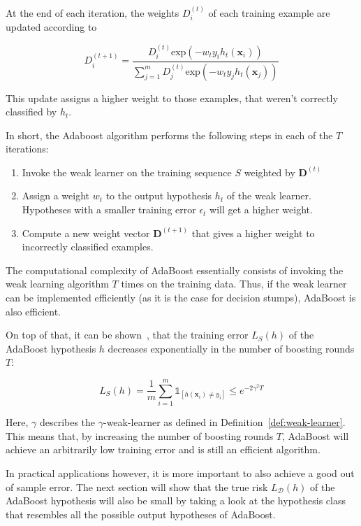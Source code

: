 At the end of each iteration, the weights $D_i^{(t)}$ of each training example are updated according to
\begin{linenomath*}
    $$
    D_i^{(t+1)} = \frac{D_i^{(t)} \text{exp} \left( -w_t y_i h_t(\mathbf{x}_i) \right)}{
        \sum_{j=1}^m D_j^{(t)} \text{exp} \left( -w_t y_j h_t(\mathbf{x}_j) \right) }
    $$
\end{linenomath*}
This update assigns a higher weight to those examples, that weren't correctly classified by $h_t$.

In short, the Adaboost algorithm performs the following steps in each of the $T$ iterations:
\begin{enumerate}
    \item Invoke the weak learner on the training sequence $S$ weighted by $\mathbf{D}^{(t)}$
    \item Assign a weight $w_t$ to the output hypothesis $h_t$ of the weak learner. Hypotheses with a smaller
        training error $\epsilon_t$ will get a higher weight.
    \item Compute a new weight vector $\mathbf{D}^{(t+1)}$ that gives a higher weight to incorrectly classified
        examples.
\end{enumerate}

The computational complexity of AdaBoost essentially consists of invoking the weak learning algorithm $T$ times on
the training data. Thus, if the weak learner can be implemented efficiently (as it is the case for decision stumps),
AdaBoost is also efficient.

On top of that, it can be shown~\cite{SSBD14}, 
that the training error $L_S(h)$ of the AdaBoost hypothesis $h$ decreases exponentially
in the number of boosting rounds $T$:
\begin{linenomath*}
    $$
    L_S(h) = \frac{1}{m} \sum_{i=1}^m \mathds{1}_{\left[ h(\mathbf{x}_i) \neq y_i \right]} \leq e^{-2 \gamma^2 T}
    $$
\end{linenomath*}
Here, $\gamma$ describes the $\gamma$-weak-learner as defined in Definition~\ref{def:weak-learner}.
This means that, by increasing the number of boosting rounds $T$,  AdaBoost will achieve an arbitrarily low training
error and is still an efficient algorithm.

In practical applications however, it is more important to also achieve a good out of sample error. The next section will
show that the true risk $L_\mathcal{D}(h)$ of the AdaBoost hypothesis will also be small by taking a look at the
hypothesis class that resembles all the possible output hypotheses of AdaBoost.

